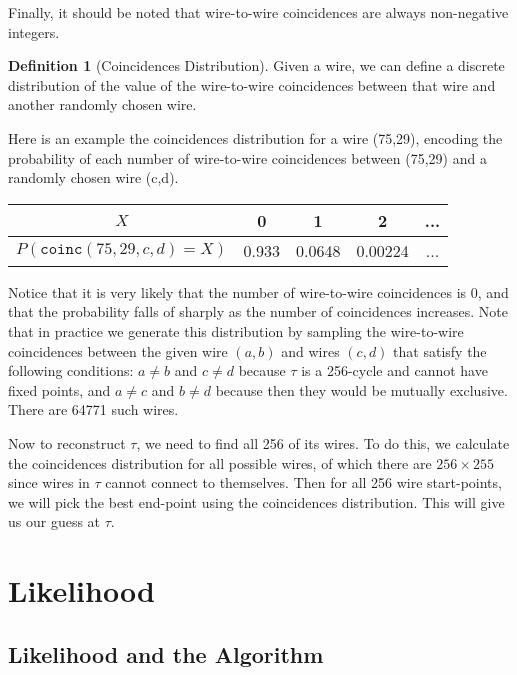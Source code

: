 \documentclass[12pt]{article}
\theoremstyle{definition}
\newtheorem{definition}{Definition}%
\theoremstyle{remark}
\theoremstyle{remark}
\begin{document}
\par
Finally, it should be noted that wire-to-wire coincidences are always non-negative integers.


\begin{definition}[Coincidences Distribution]
	Given a wire, we can define a discrete distribution of the value of the wire-to-wire coincidences between that wire and another randomly chosen wire.
\end{definition}
\par
Here is an example the coincidences distribution for a wire (75,29), encoding the probability of each number of wire-to-wire coincidences between (75,29) and a randomly chosen wire (c,d).
\begin{center}
\begin{tabular}{|c|c|c|c|c|}
\hline
$X$ & 0 & 1 & 2 & ... \\
\hline 
$P(\texttt{coinc}(75,29,c,d)=X)$ & 0.933 & 0.0648 & 0.00224 & ... \\

\hline
\end{tabular}
\end{center}
Notice that it is very likely that the number of wire-to-wire coincidences is 0, and that the probability falls of sharply as the number of coincidences increases. Note that in practice we generate this distribution by sampling the wire-to-wire coincidences between the given wire $(a,b)$ and wires $(c,d)$ that satisfy the following conditions: $a\neq b$ and $c\neq d$ because $\tau$ is a 256-cycle and cannot have fixed points, and $a\neq c$ and $b \neq d$ because then they would be mutually exclusive. There are 64771 such wires. 

\par
Now to reconstruct $\tau$, we need to find all 256 of its wires. To do this, we calculate the coincidences distribution for all possible wires, of which there are $256 \times 255$ since wires in $\tau$ cannot connect to themselves. Then for all 256 wire start-points, we will pick the best end-point using the coincidences distribution. This will give us our guess at $\tau$.


\section{Likelihood}
\subsection{Likelihood and the Algorithm}
\end{document}
